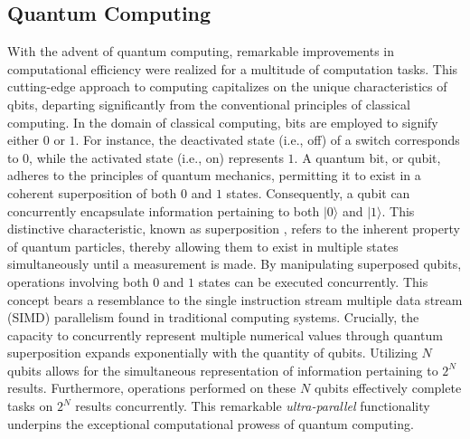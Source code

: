 \documentclass[journal]{IEEEtran}
\begin{document}
\subsection{Quantum Computing}
With the advent of quantum computing, remarkable improvements in computational efficiency were realized for a multitude of computation tasks.
This cutting-edge approach to computing capitalizes on the unique characteristics of qbits, departing significantly from the conventional principles of classical computing.
In the domain of classical computing, bits are employed to signify either $0$ or $1$.
For instance, the deactivated state (i.e., off) of a switch corresponds to $0$, while the activated state (i.e., on) represents $1$.
A quantum bit, or qubit, adheres to the principles of quantum mechanics, permitting it to exist in a coherent superposition of both $0$ and $1$ states.
Consequently, a qubit can concurrently encapsulate information pertaining to both $|0\rangle$ and $|1\rangle$.
This distinctive characteristic, known as superposition \cite{steane1998quantum}, refers to the inherent property of quantum particles, thereby allowing them to exist in multiple states simultaneously until a measurement is made.
By manipulating superposed qubits, operations involving both $0$ and $1$ states can be executed concurrently.
This concept bears a resemblance to the single instruction stream multiple data stream (SIMD) parallelism found in traditional computing systems.
Crucially, the capacity to concurrently represent multiple numerical values through quantum superposition expands exponentially with the quantity of qubits.
Utilizing $N$ qubits allows for the simultaneous representation of information pertaining to $2^N$ results.
Furthermore, operations performed on these $N$ qubits effectively complete tasks on $2^N$ results concurrently.
This remarkable {\em ultra-parallel} functionality underpins the exceptional computational prowess of quantum computing.
\end{document}
